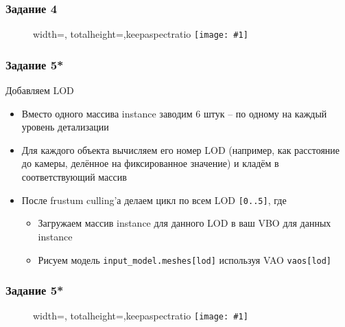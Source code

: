 \documentclass{beamer}
\newcommand{\slideimage}[1]{
  \begin{figure}
    \begin{adjustbox}{width=\textwidth, totalheight=\textheight-2\baselineskip-2\baselineskip,keepaspectratio}
      \texttt{[image: \#1]}
    \end{adjustbox}
  \end{figure}
}
\begin{document}
\begin{frame}
\frametitle{Задание 4}
\slideimage{2.png}
\end{frame}

\begin{frame}[fragile]
\fontsize{10pt}{10pt}
\frametitle{Задание 5*}
Добавляем LOD
\begin{itemize}
\item Вместо одного массива instance заводим 6 штук -- по одному на каждый уровень детализации
\item Для каждого объекта вычисляем его номер LOD (например, как расстояние до камеры, делённое на фиксированное значение) и кладём в соответствующий массив
\item После frustum culling'а делаем цикл по всем LOD \verb|[0..5]|, где
\begin{itemize}
\item Загружаем массив instance для данного LOD в ваш VBO для данных instance
\item Рисуем модель \verb|input_model.meshes[lod]| используя VAO \verb|vaos[lod]|
\end{itemize}
\end{itemize}
\end{frame}

\begin{frame}
\frametitle{Задание 5*}
\slideimage{5.png}
\end{frame}
\end{document}
